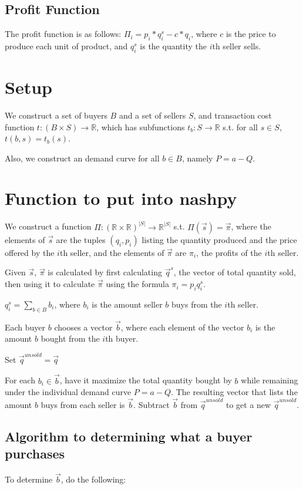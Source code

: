\documentclass[14pt]{article}
\newcommand{\R}{\mathds {R}}
\begin{document}
\subsection{Profit Function}
The profit function is as follows: $\Pi_i = p_i * q_i^s - c*q_i$, where $c$
is the price to produce each unit of product, and $q_i^s$ is the quantity 
the $i$th seller sells.  


\section{Setup}
We construct a set of buyers $B$ and a set of sellers $S$, and transaction cost
function $t: (B\times S)\rightarrow \R$, which has subfunctions $t_b:
S\rightarrow \R$ s.t. for all $s\in S$, $t(b,s) = t_b(s)$.

Also, we construct an demand curve for all $b\in B$, namely $P = a - Q$.

\section{Function to put into nashpy}
We construct a function $\Pi : (\R\times\R)^{|S|} \rightarrow \R^{|S|}$ s.t.
$\Pi(\vec{s}) = \vec{\pi}$, where the elements of $\vec{s}$ are the tuples
$(q_i,p_i)$ listing the quantity produced and the price offered by the $i$th
seller, and the elements of $\vec{\pi}$ are $\pi_i$, the profits of the $i$th seller.

Given $\vec{s}$, $\vec{\pi}$ is calculated by first calculating $\vec{q}^s$, the
vector of total quantity sold, then using it to calculate $\vec{\pi}$ using the formula $\pi_i = p_iq^s_i$.  

$q^s_i = \sum _{b\in B} b_i$, where $b_i$ is the amount seller $b$ buys from
the $i$th seller.  

Each buyer $b$ chooses a vector $\vec{b}$, where each element of the vector
$b_i$ is the amount $b$ bought from the $i$th buyer.  

Set $\vec{q}^{unsold} = \vec{q}$

For each $b_i \in \vec{b}$, have it maximize the total quantity bought by $b$
while remaining under the individual demand curve $P=a-Q$.  The resulting
vector that lists the amount $b$ buys from each seller is $\vec{b}$.  Subtract $\vec{b}$ from $\vec{q}^{unsold}$ to get a new $\vec{q}^{unsold}$.

\subsection{Algorithm to determining what a buyer purchases}
To determine $\vec{b}$, do the following:
\end{document}
